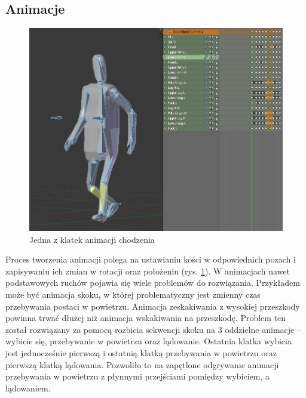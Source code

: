 \documentclass[multip]{SGGW-thesis}
\begin{document}
	\subsection{Animacje}
\begin{figure}
		\centering
			\includegraphics[width=1\textwidth]{figures/adiwalk.jpg}
		\caption{Jedna z klatek animacji chodzenia}
		\label{blender-anim}
\end{figure}
Proces tworzenia animacji polega na ustawianiu kości w odpowiednich pozach i zapisywaniu ich zmian w rotacji oraz położeniu (rys. \ref{blender-anim}). 
W animacjach nawet podstawowych ruchów pojawia się wiele problemów do rozwiązania. Przykładem może być animacja skoku, w której problematyczny jest zmienny czas przebywania postaci w powietrzu. Animacja zeskakiwania z wysokiej przeszkody powinna trwać dłużej niż animacja wskakiwania na przeszkodę. Problem ten został rozwiązany za pomocą rozbicia sekwencji skoku na 3 oddzielne animacje – wybicie się, przebywanie w powietrzu oraz lądowanie. Ostatnia klatka wybicia jest jednocześnie pierwszą i ostatnią klatką przebywania w powietrzu oraz pierwszą klatką lądowania. Pozwoliło to na zapętlone odgrywanie animacji przebywania w powietrzu z płynnymi przejściami pomiędzy wybiciem, a lądowaniem.
\end{document}
